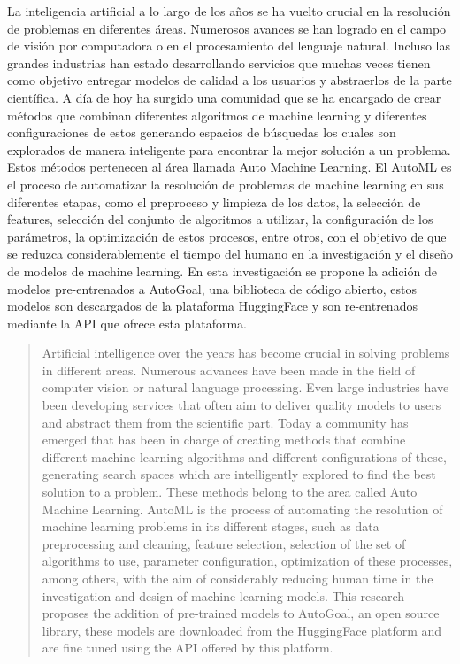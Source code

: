 \begin{resumen}
	La inteligencia artificial a lo largo de los años se ha vuelto crucial en la resolución de problemas en diferentes áreas. Numerosos avances se han logrado en el campo de visión por computadora o en el procesamiento del lenguaje natural. Incluso las grandes industrias han estado desarrollando servicios que muchas veces tienen como objetivo entregar modelos de calidad a los usuarios y abstraerlos de la parte científica. A día de hoy ha surgido una comunidad que se ha encargado de crear métodos que combinan diferentes algoritmos de machine learning y diferentes configuraciones de estos generando espacios de búsquedas los cuales son explorados de manera inteligente para encontrar la mejor solución a un problema. Estos métodos pertenecen al área llamada Auto Machine Learning. El AutoML es el proceso de automatizar la resolución de problemas de machine learning en sus diferentes etapas, como el preproceso y limpieza de los datos, la selección de features, selección del conjunto de algoritmos a utilizar, la configuración de los parámetros, la optimización de estos procesos, entre otros, con el objetivo de que se reduzca considerablemente el tiempo del humano en la investigación y el diseño de modelos de machine learning. En esta investigación se propone la adición de modelos pre-entrenados a AutoGoal, una biblioteca de código abierto, estos modelos son descargados de la plataforma HuggingFace y son re-entrenados mediante la API que ofrece esta plataforma.
\end{resumen}

\begin{abstract}
	Artificial intelligence over the years has become crucial in solving problems in different areas. Numerous advances have been made in the field of computer vision or natural language processing. Even large industries have been developing services that often aim to deliver quality models to users and abstract them from the scientific part. Today a community has emerged that has been in charge of creating methods that combine different machine learning algorithms and different configurations of these, generating search spaces which are intelligently explored to find the best solution to a problem. These methods belong to the area called Auto Machine Learning. AutoML is the process of automating the resolution of machine learning problems in its different stages, such as data preprocessing and cleaning, feature selection, selection of the set of algorithms to use, parameter configuration, optimization of these processes, among others, with the aim of considerably reducing human time in the investigation and design of machine learning models. This research proposes the addition of pre-trained models to AutoGoal, an open source library, these models are downloaded from the HuggingFace platform and are fine tuned using the API offered by this platform.
\end{abstract}